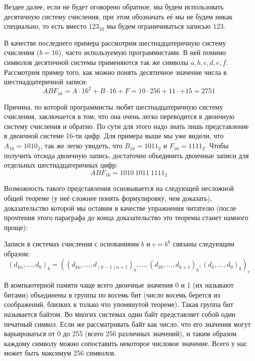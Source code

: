 Вездее далее, если не будет оговорено обратное, мы будем использовать десятичную систему счисления, при этом обозначать её мы не будем никак специально, то есть вместо $123_{10}$ мы будем ограничиваться записью $123$.

В качестве последнего примера рассмотрим шестнадцатеричную систему счисления ($b=16$), часто используемую программистами. В ней помимо символов десятичной системы применяются так же символы $a, b, c, d, e, f$. Рассмотрим пример того, как можно понять десятичное значение числа в шестнадцатеричной записи:
$$ABF_{16} = A\cdot 16^2 + B\cdot 16 + F = 10\cdot 256 + 11 \cdot + 15 = 2751$$

Причина, по которой программисты любят шестнадцатеричную систему счисления, заключается в том, что она очень легко переводится в двоичную систему счисления и обратно. По сути для этого надо знать лишь представление в двоичной системе 16-ти цифр. Для примера выше мы уже видели, что $A_{16} = 1010_2$, так же легко увидеть, что $B_{16} = 1011_2$ и $F_{16} = 1111_2$. Чтобы получить отсюда двоичную запись, достаточно объединить двоичные записи для отдельных шестнадцатеричных цифр: $$ABF_{16} = 1010\:1011\:1111_2$$

Возможность такого представления основывается на следующей несложной общей теореме (у неё сложнее понять формулировку, чем доказать), доказательство которой мы оставим в качестве упражнения читателю (после прочтения этого параграфа до конца доказательство это теоремы станет намного проще):
\begin{thm}
Записи в системах счисления с основаниями $b$ и $c = b^k$ связаны следующим образом: $$(d_{kn},\dots, d_0)_b = ((d_{kn}, \ldots, d_{(k-1)n + 1})_b, \dots, (d_{2k}, \dots, d_{k+1})_b , (d_k, \dots, d_0)_b)_c$$
\end{thm}

В компьютерной памяти чаще всего двоичные значения 0 и 1 (их называют битами) объединены в группы по восемь бит (число восемь берется из соображений, близких к только что упомянутой теореме). Такая группа бит называется байтом. Во многих системах один байт представляет собой один печатный символ. Если же рассматривать байт как число, что его значения могут варьироваться от 0 до 255 (всего 256 различных значений), и таким образом каждому символу можно сопоставить некоторое числовое значение. Всего у нас может быть максимум 256 символов.

